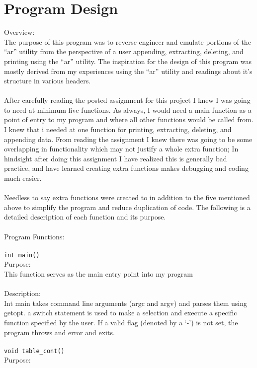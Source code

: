 \documentclass[12pt,letterpaper]{article}
\begin{document}
\section{Program Design}
{\large Overview:}
\\
The purpose of this program was to reverse engineer and emulate portions of the “ar” utility from the perspective of a user appending, extracting, deleting, and printing using the “ar” utility. The inspiration for the design of this program was mostly derived from my experiences using the “ar” utility and readings about it’s structure in various headers.
\\\\
After carefully reading the posted assignment for this project I knew I was going to need at minimum five functions. As always, I would need a main function as a point of entry to my program and where all other functions would be called from. I knew that i needed at one function for printing, extracting, deleting, and appending data. From reading the assignment I knew there was going to be some overlapping in functionality which may not justify a whole extra function; In hindsight after doing this assignment I have realized this is generally bad practice, and have learned creating extra functions makes debugging and coding much easier.
\\\\
Needless to say extra functions were created to in addition to the five mentioned above to simplify the program and reduce duplication of code. The following is a detailed description of each function and its purpose.
\\\\
{\large Program Functions:}
\\\\
\texttt{int main()}
\\
Purpose:
\\
This function serves as the main entry point into my program
\\\\
Description:
\\
Int main takes command line arguments (argc and argv) and parses them using getopt. a switch statement is used to make a selection and execute a specific function specified by the user. If a valid flag (denoted by a ‘-’) is not set, the program throws and error and exits.
\\\\
\texttt{void table\_cont()}
\\
Purpose:
\\
\end{document}
